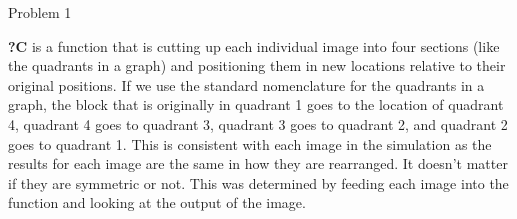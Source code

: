\begin{problem}{Problem 1}
\begin{highlight}[Solution]
        \textbf{?C} is a function that is cutting up each individual image into four sections (like the quadrants in a graph) and positioning them in new locations relative to their original positions. 
        If we use the standard nomenclature for the quadrants in a graph, the block that is originally in quadrant 1 goes to the location of quadrant 4, quadrant 4 goes to quadrant 3, quadrant 3 goes to 
        quadrant 2, and quadrant 2 goes to quadrant 1. This is consistent with each image in the simulation as the results for each image are the same in how they are rearranged. It doesn't matter if 
        they are symmetric or not. This was determined by feeding each image into the function and looking at the output of the image.
    \end{highlight}
\end{problem}


